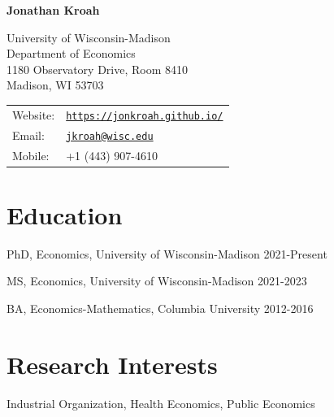\documentclass[letterpaper]{article}
\def\name{Jonathan Kroah}
\renewenvironment{itemize}{
	\begin{list}{}{
			\setlength{\leftmargin}{1.5em}
		}
	}{
	\end{list}
}
\begin{document}
	
	
	\centerline{\huge \bf \name}
	
	\vspace{0.25in}
	
	\begin{minipage}{0.45\linewidth}
		University of Wisconsin-Madison \\
		Department of Economics \\
		1180 Observatory Drive, Room 8410 \\
		Madison, WI 53703
	\end{minipage}
	\begin{minipage}{0.45\linewidth}
		\begin{tabular}{ll}
			Website: & \href{https://jonkroah.github.io/}{\tt https://jonkroah.github.io/} \\
			Email: & \href{mailto:jkroah@wisc.edu}{\tt jkroah@wisc.edu} \\
			Mobile: & +1 (443) 907-4610 \\
		\end{tabular}
	\end{minipage}
	
	
	\section*{Education}
	\begin{itemize}
		\item PhD, Economics, University of Wisconsin-Madison \hfill 2021-Present
		\item MS, Economics, University of Wisconsin-Madison \hfill 2021-2023
		\item BA, Economics-Mathematics, Columbia University \hfill 2012-2016
	\end{itemize}
	
	
	\section*{Research Interests}
	\begin{itemize}
		\item Industrial Organization, Health Economics, Public Economics
	\end{itemize}
	
\end{document}
